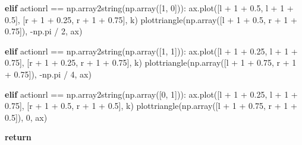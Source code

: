 \documentclass[
]{article}
\newenvironment{Shaded}{\begin{snugshade}}{\end{snugshade}}
\newcommand{\ControlFlowTok}[1]{\textcolor[rgb]{0.00,0.23,0.31}{\textbf{#1}}}
\newcommand{\DecValTok}[1]{\textcolor[rgb]{0.68,0.00,0.00}{#1}}
\newcommand{\FloatTok}[1]{\textcolor[rgb]{0.68,0.00,0.00}{#1}}
\newcommand{\NormalTok}[1]{\textcolor[rgb]{0.00,0.23,0.31}{#1}}
\newcommand{\OperatorTok}[1]{\textcolor[rgb]{0.37,0.37,0.37}{#1}}
\newcommand{\StringTok}[1]{\textcolor[rgb]{0.13,0.47,0.30}{#1}}
\begin{document}
\begin{Shaded}
\begin{Highlighting}[]
                \ControlFlowTok{elif}\NormalTok{ actionrl }\OperatorTok{==}\NormalTok{ np.array2string(np.array([}\DecValTok{1}\NormalTok{, }\DecValTok{0}\NormalTok{])):}
\NormalTok{                    ax.plot([l }\OperatorTok{+} \DecValTok{1} \OperatorTok{+} \FloatTok{0.5}\NormalTok{, l }\OperatorTok{+} \DecValTok{1} \OperatorTok{+} \FloatTok{0.5}\NormalTok{], [r }\OperatorTok{+} \DecValTok{1} \OperatorTok{+} \FloatTok{0.25}\NormalTok{, r }\OperatorTok{+} \DecValTok{1} \OperatorTok{+} \FloatTok{0.75}\NormalTok{], }\StringTok{\textquotesingle{}k\textquotesingle{}}\NormalTok{)}
\NormalTok{                    plottriangle(np.array([l }\OperatorTok{+} \DecValTok{1} \OperatorTok{+} \FloatTok{0.5}\NormalTok{, r }\OperatorTok{+} \DecValTok{1} \OperatorTok{+} \FloatTok{0.75}\NormalTok{]), }\OperatorTok{{-}}\NormalTok{np.pi }\OperatorTok{/} \DecValTok{2}\NormalTok{, ax)}

                \ControlFlowTok{elif}\NormalTok{ actionrl }\OperatorTok{==}\NormalTok{ np.array2string(np.array([}\DecValTok{1}\NormalTok{, }\DecValTok{1}\NormalTok{])):}
\NormalTok{                    ax.plot([l }\OperatorTok{+} \DecValTok{1} \OperatorTok{+} \FloatTok{0.25}\NormalTok{, l }\OperatorTok{+} \DecValTok{1} \OperatorTok{+} \FloatTok{0.75}\NormalTok{], [r }\OperatorTok{+} \DecValTok{1} \OperatorTok{+} \FloatTok{0.25}\NormalTok{, r }\OperatorTok{+} \DecValTok{1} \OperatorTok{+} \FloatTok{0.75}\NormalTok{], }\StringTok{\textquotesingle{}k\textquotesingle{}}\NormalTok{)}
\NormalTok{                    plottriangle(np.array([l }\OperatorTok{+} \DecValTok{1} \OperatorTok{+} \FloatTok{0.75}\NormalTok{, r }\OperatorTok{+} \DecValTok{1} \OperatorTok{+} \FloatTok{0.75}\NormalTok{]), }\OperatorTok{{-}}\NormalTok{np.pi }\OperatorTok{/} \DecValTok{4}\NormalTok{, ax)}

                \ControlFlowTok{elif}\NormalTok{ actionrl }\OperatorTok{==}\NormalTok{ np.array2string(np.array([}\DecValTok{0}\NormalTok{, }\DecValTok{1}\NormalTok{])):}
\NormalTok{                    ax.plot([l }\OperatorTok{+} \DecValTok{1} \OperatorTok{+} \FloatTok{0.25}\NormalTok{, l }\OperatorTok{+} \DecValTok{1} \OperatorTok{+} \FloatTok{0.75}\NormalTok{], [r }\OperatorTok{+} \DecValTok{1} \OperatorTok{+} \FloatTok{0.5}\NormalTok{, r }\OperatorTok{+} \DecValTok{1} \OperatorTok{+} \FloatTok{0.5}\NormalTok{], }\StringTok{\textquotesingle{}k\textquotesingle{}}\NormalTok{)}
\NormalTok{                    plottriangle(np.array([l }\OperatorTok{+} \DecValTok{1} \OperatorTok{+} \FloatTok{0.75}\NormalTok{, r }\OperatorTok{+} \DecValTok{1} \OperatorTok{+} \FloatTok{0.5}\NormalTok{]), }\DecValTok{0}\NormalTok{, ax)}


    \ControlFlowTok{return}
\end{Highlighting}
\end{Shaded}
\end{document}
